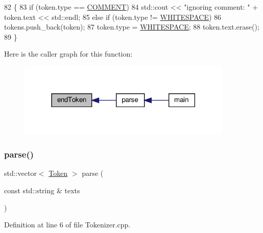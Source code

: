 \begin{DoxyCode}
82     \{
83         \textcolor{keywordflow}{if} (token.type == \hyperlink{namespaceft_aa520fbf142ba1e7e659590c07da31921aae696377c19e507b64e16be78ce3bbdb}{COMMENT})
84             std::cout << \textcolor{stringliteral}{"ignoring comment: "} + token.text << std::endl;
85         \textcolor{keywordflow}{else} \textcolor{keywordflow}{if} (token.type != \hyperlink{namespaceft_aa520fbf142ba1e7e659590c07da31921aba113c37f25d24aada154b75c7dd91ba}{WHITESPACE})
86             tokens.push\_back(token);
87         token.type = \hyperlink{namespaceft_aa520fbf142ba1e7e659590c07da31921aba113c37f25d24aada154b75c7dd91ba}{WHITESPACE};
88         token.text.erase();
89     \}
\end{DoxyCode}
Here is the caller graph for this function\+:
\nopagebreak
\begin{figure}[H]
\begin{center}
\leavevmode
\includegraphics[width=290pt]{classft_1_1_tokenizer_a4d9a98ce2e5ef728cfa5a68c8f726587_icgraph}
\end{center}
\end{figure}
\mbox{\label{classft_1_1_tokenizer_a10bacfc70f3d74a0e04218c1df86f6c2}} 
\subsubsection{\texorpdfstring{parse()}{parse()}}
{\footnotesize\ttfamily std\+::vector$<$ \hyperlink{classft_1_1_token}{Token} $>$ parse (\begin{DoxyParamCaption}\item[{const std\+::string \&}]{texts }\end{DoxyParamCaption})}



Definition at line 6 of file Tokenizer.\+cpp.


